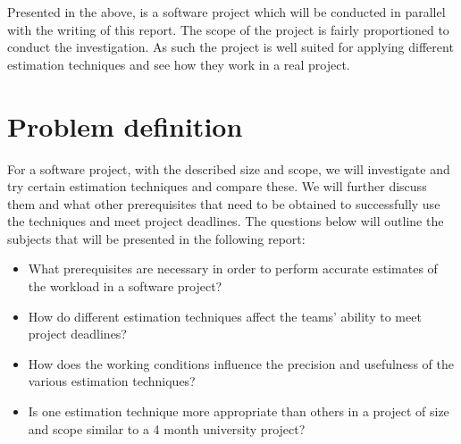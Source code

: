 Presented in the above, is a software project which will be conducted in parallel with the writing of this report. The scope of the project is fairly proportioned to conduct the investigation. As such the project is well suited for applying different estimation techniques and see how they work in a real project. 


\section{Problem definition}
For a software project, with the described size and scope, we will investigate and try certain estimation techniques and compare these. We will further discuss them and what other prerequisites that need to be obtained to successfully use the techniques and meet project deadlines. The questions below will outline the subjects that will be presented in the following report:  
\begin{itemize}
\item What prerequisites are necessary in order to perform accurate estimates of the workload in a software project?
\item How do different estimation techniques affect the teams' ability to meet project deadlines?
\item How does the working conditions influence the precision and usefulness of the various estimation techniques?	
\item Is one estimation technique more appropriate than others in a project of size and scope similar to a 4 month university project?
\newpage

\end{itemize}
